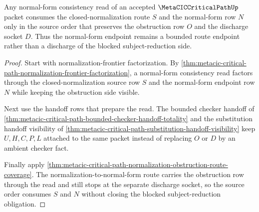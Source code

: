 \begin{theorem}
\label{thm:metacic-critical-path-normalization-obstruction-source-order}
Any normal-form consistency read of an accepted $\MetaCICCriticalPathUp$ packet consumes the closed-normalization route $S$ and the normal-form row $N$ only in the source order that preserves the obstruction row $O$ and the discharge socket $D$. Thus the normal-form endpoint remains a bounded route endpoint rather than a discharge of the blocked subject-reduction side.
\end{theorem}
\begin{proof}
Start with normalization-frontier factorization. By \autoref{thm:metacic-critical-path-normalization-frontier-factorization}, a normal-form consistency read factors through the closed-normalization source row $S$ and the normal-form endpoint row $N$ while keeping the obstruction side visible.

Next use the handoff rows that prepare the read. The bounded checker handoff of \autoref{thm:metacic-critical-path-bounded-checker-handoff-totality} and the substitution handoff visibility of \autoref{thm:metacic-critical-path-substitution-handoff-visibility} keep $U,H,C,P,L$ attached to the same packet instead of replacing $O$ or $D$ by an ambient checker fact.

Finally apply \autoref{thm:metacic-critical-path-normalization-obstruction-route-coverage}. The normalization-to-normal-form route carries the obstruction row through the read and still stops at the separate discharge socket, so the source order consumes $S$ and $N$ without closing the blocked subject-reduction obligation.
\end{proof}

